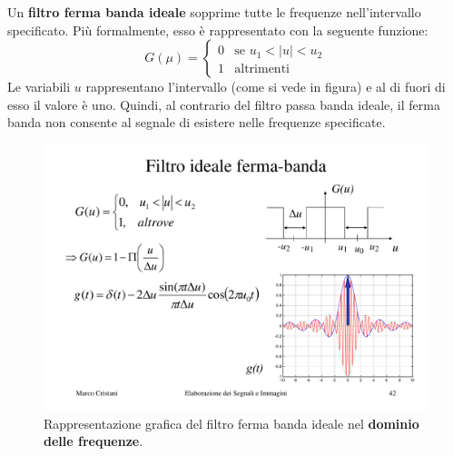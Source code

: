 \documentclass[a4paper]{article}
\begin{document}
	\noindent
	Un \textcolor{Red3}{\textbf{filtro ferma banda ideale}} sopprime tutte le frequenze nell'intervallo specificato. Più formalmente, esso è rappresentato con la seguente funzione:
	\begin{equation*}
		G\left(\mu\right) = \begin{cases}
			0	& \text{se } u_{1} < \left|u\right| < u_{2} \\
			1	& \text{altrimenti}
		\end{cases}
	\end{equation*}
	Le variabili $u$ rappresentano l'intervallo (come si vede in figura) e al di fuori di esso il valore è uno. Quindi, al contrario del filtro passa banda ideale, il ferma banda non consente al segnale di esistere nelle frequenze specificate.
	\begin{figure}[!htp]
		\centering
		\includegraphics[width=.5\textwidth]{img/filtro_ferma_banda_ideale.pdf}
		\caption{Rappresentazione grafica del filtro ferma banda ideale nel \textbf{dominio delle frequenze}.}
	\end{figure}
\end{document}

